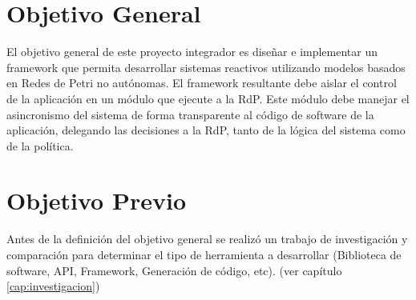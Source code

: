 \section{Objetivo General}
El objetivo general de este proyecto integrador es diseñar e implementar un
framework que permita desarrollar sistemas reactivos utilizando modelos basados
en Redes de Petri no autónomas. El framework resultante debe aislar el control
de la aplicación en un módulo que ejecute a la RdP. Este módulo debe manejar el
asincronismo del sistema de forma transparente al código de software de la
aplicación, delegando las decisiones a la RdP, tanto de la lógica del sistema
como de la política.

\section{Objetivo Previo}
Antes de la definición del objetivo general se realizó un trabajo de
investigación y comparación para determinar el tipo de herramienta a
desarrollar (Biblioteca de software, API, Framework, Generación de código,
etc). (ver capítulo \ref{cap:investigacion})


